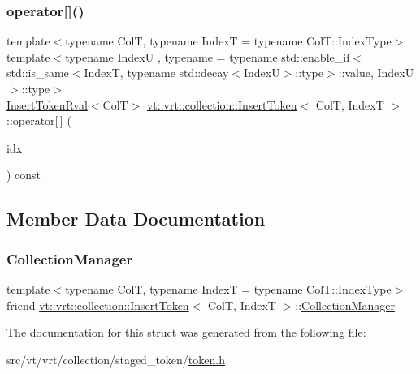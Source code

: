 \subsubsection{\texorpdfstring{operator[]()}{operator[]()}\hspace{0.1cm}{\footnotesize\ttfamily [2/2]}}
{\footnotesize\ttfamily template$<$typename ColT, typename IndexT = typename Col\+T\+::\+Index\+Type$>$ \\
template$<$typename IndexU , typename  = typename std\+::enable\+\_\+if$<$      std\+::is\+\_\+same$<$\+Index\+T, typename std\+::decay$<$\+Index\+U$>$\+::type$>$\+::value, Index\+U    $>$\+::type$>$ \\
\hyperlink{structvt_1_1vrt_1_1collection_1_1_insert_token_rval}{Insert\+Token\+Rval}$<$ColT$>$ \hyperlink{structvt_1_1vrt_1_1collection_1_1_insert_token}{vt\+::vrt\+::collection\+::\+Insert\+Token}$<$ ColT, IndexT $>$\+::operator\mbox{[}$\,$\mbox{]} (\begin{DoxyParamCaption}\item[{IndexU const \&}]{idx }\end{DoxyParamCaption}) const\hspace{0.3cm}{\ttfamily [inline]}}



\subsection{Member Data Documentation}
\mbox{\label{structvt_1_1vrt_1_1collection_1_1_insert_token_a42b6dc06fe8e840dd6ad6c9254b937c3}} 
\subsubsection{\texorpdfstring{Collection\+Manager}{CollectionManager}}
{\footnotesize\ttfamily template$<$typename ColT, typename IndexT = typename Col\+T\+::\+Index\+Type$>$ \\
friend \hyperlink{structvt_1_1vrt_1_1collection_1_1_insert_token}{vt\+::vrt\+::collection\+::\+Insert\+Token}$<$ ColT, IndexT $>$\+::\hyperlink{structvt_1_1vrt_1_1collection_1_1_collection_manager}{Collection\+Manager}}



The documentation for this struct was generated from the following file\+:\begin{DoxyCompactItemize}
\item 
src/vt/vrt/collection/staged\+\_\+token/\hyperlink{token_8h}{token.\+h}\end{DoxyCompactItemize}
